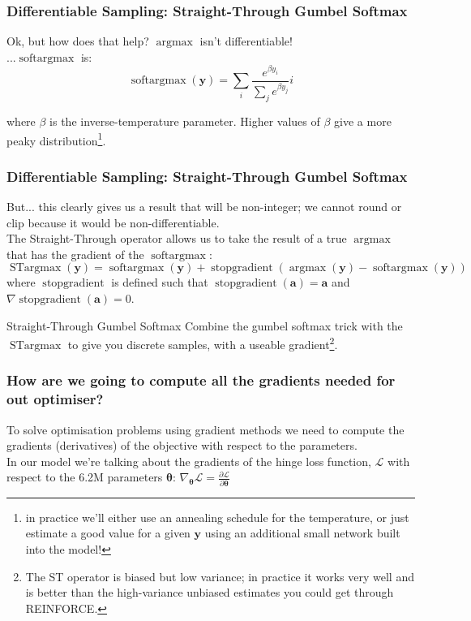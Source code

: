 \documentclass[\beamerclass,aspectratio=1610]{beamer}
\begin{document}
\begin{frame}
\frametitle{Differentiable Sampling: Straight-Through Gumbel Softmax}
Ok, but how does that help? $\operatorname{argmax}$ isn't differentiable! \pause
\\[0.5em]
...$\operatorname{softargmax}$ is:
\begin{equation*}
	\operatorname{softargmax}(\bm{y}) = \sum_i \frac{e^{\beta y_i}}{\sum_j e^{\beta y_j}} i
\end{equation*}

where $\beta$ is the inverse-temperature parameter. Higher values of $\beta$ give a more peaky distribution\footnote{in practice we'll either use an annealing schedule for the temperature, or just estimate a good value for a given $\bm{y}$ using an additional small network built into the model!}.
\end{frame}

\begin{frame}
\frametitle{Differentiable Sampling: Straight-Through Gumbel Softmax}
But... this clearly gives us a result that will be non-integer; we cannot round or clip because it would be non-differentiable. \pause
\\[0.5em]
The Straight-Through operator allows us to take the result of a true $\operatorname{argmax}$ that has the gradient of the $\operatorname{softargmax}$:
\begin{equation*}
	\operatorname{STargmax}(\bm{y}) = \operatorname{softargmax}(\bm{y}) + \operatorname{stopgradient}(\operatorname{argmax}(\bm{y}) - \operatorname{softargmax}(\bm{y})) 
\end{equation*}
where $\operatorname{stopgradient}$ is defined such that $\operatorname{stopgradient}(\bm{a}) = \bm{a}$ and $\nabla \operatorname{stopgradient}(\bm{a}) = 0$.
\pause
\begin{block}{Straight-Through Gumbel Softmax}
Combine the gumbel softmax trick with the $\operatorname{STargmax}$ to give you discrete samples, with a useable gradient\footnote{The ST operator is biased but low variance; in practice it works very well and is better than the high-variance unbiased estimates you could get through REINFORCE.}.
\end{block}

\end{frame}

\begin{frame}
\frametitle{How are we going to compute all the gradients needed for out optimiser?}
To solve optimisation problems using gradient methods we need to compute the gradients (derivatives) of the objective with respect to the parameters.
\\[0.5em]
In our model we're talking about the gradients of the hinge loss function, $\mathcal{L}$ with respect to the 6.2M parameters $\bm{\theta}$: $\nabla_{\bm{\theta}} \mathcal{L} = \frac{\partial \mathcal{L}}{\partial \bm{\theta}}$

\end{frame}
\end{document}
